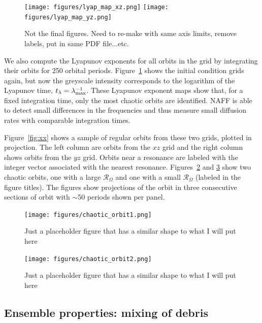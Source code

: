 \documentclass[letterpaper,12pt,preprint]{aastex}
\newcommand{\fdrate}{\mathcal{R}_\Omega}
\begin{document}
\begin{figure}[!h]
\centering
	\texttt{[image: figures/lyap\_map\_xz.png]}
	\texttt{[image: figures/lyap\_map\_yz.png]}
	\caption{Not the final figures. Need to re-make with same axis limits, remove labels, put in same PDF file...etc.} 
	\label{fig:lyapmap}
\end{figure}

We also compute the Lyapunov exponents for all orbits in the grid by integrating their orbits for 250 orbital periods. Figure~\ref{fig:lyapmap} shows the initial condition grids again, but now the greyscale intensity corresponds to the logarithm of the Lyapunov time, $t_\lambda = \lambda_{\rm max}^{-1}$. These Lyapunov exponent maps show that, for a fixed integration time, only the most chaotic orbits are identified. NAFF is able to detect small differences in the frequencies and thus measure small diffusion rates with comparable integration times.

Figure~\ref{fig:xx} shows a sample of regular orbits from these two grids, plotted in projection. The left column are orbits from the $xz$ grid and the right column shows orbits from the $yz$ grid. Orbits near a resonance are labeled with the integer vector associated with the nearest resonance. Figures~\ref{fig:chaotic1} and \ref{fig:chaotic2} show two chaotic orbits, one with a large $\fdrate$ and one with a small $\fdrate$ (labeled in the figure titles). The figures show projections of the orbit in three consecutive sections of orbit with $\sim$50 periods shown per panel.

\begin{figure}[!h]
\begin{center}
\texttt{[image: figures/chaotic\_orbit1.png]}
\caption{Just a placeholder figure that has a similar shape to what I will put here} \label{fig:chaotic1}
\end{center}
\end{figure}

\begin{figure}[!h]
\begin{center}
\texttt{[image: figures/chaotic\_orbit2.png]}
\caption{Just a placeholder figure that has a similar shape to what I will put here} \label{fig:chaotic2}
\end{center}
\end{figure}

\subsection{Ensemble properties: mixing of debris}
\end{document}
